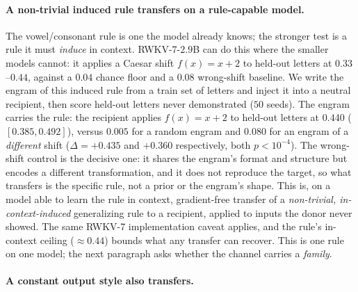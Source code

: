 \documentclass[11pt]{article}
\theoremstyle{definition}
\begin{document}
\paragraph{A non-trivial induced rule transfers on a rule-capable model.}
The vowel/consonant rule is one the model already knows; the stronger test is a rule it must \emph{induce} in context. RWKV-7-$2.9$B can do this where the smaller models cannot: it applies a Caesar shift $f(x)=x{+}2$ to held-out letters at $0.33$--$0.44$, against a $0.04$ chance floor and a $0.08$ wrong-shift baseline. We write the engram of this induced rule from a train set of letters and inject it into a neutral recipient, then score held-out letters never demonstrated ($50$ seeds). The engram carries the rule: the recipient applies $f(x)=x{+}2$ to held-out letters at $0.440$ ($[0.385,0.492]$), versus $0.005$ for a random engram and $0.080$ for an engram of a \emph{different} shift ($\Delta=+0.435$ and $+0.360$ respectively, both $p<10^{-4}$). The wrong-shift control is the decisive one: it shares the engram's format and structure but encodes a different transformation, and it does not reproduce the target, so what transfers is the specific rule, not a prior or the engram's shape. This is, on a model able to learn the rule in context, gradient-free transfer of a \emph{non-trivial, in-context-induced} generalizing rule to a recipient, applied to inputs the donor never showed. The same RWKV-7 implementation caveat applies, and the rule's in-context ceiling ($\approx 0.44$) bounds what any transfer can recover. This is one rule on one model; the next paragraph asks whether the channel carries a \emph{family}.

\paragraph{A constant output style also transfers.}
\end{document}
